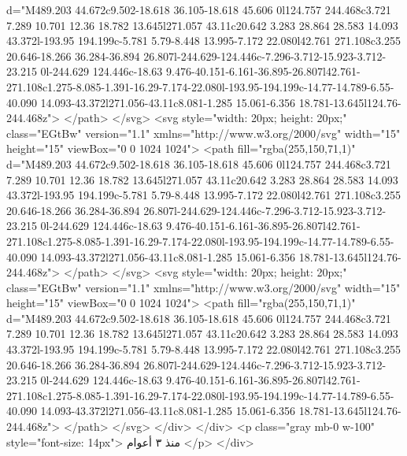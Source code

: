                         d="M489.203 44.672c9.502-18.618 36.105-18.618 45.606 0l124.757 244.468c3.721 7.289 10.701 12.36 18.782 13.645l271.057 43.11c20.642 3.283 28.864 28.583 14.093 43.372l-193.95 194.199c-5.781 5.79-8.448 13.995-7.172 22.080l42.761 271.108c3.255 20.646-18.266 36.284-36.894 26.807l-244.629-124.446c-7.296-3.712-15.923-3.712-23.215 0l-244.629 124.446c-18.63 9.476-40.151-6.161-36.895-26.807l42.761-271.108c1.275-8.085-1.391-16.29-7.174-22.080l-193.95-194.199c-14.77-14.789-6.55-40.090 14.093-43.372l271.056-43.11c8.081-1.285 15.061-6.356 18.781-13.645l124.76-244.468z">
                      </path>
                    </svg>
                    <svg style="width: 20px; height: 20px;" class="EGtBw" version="1.1"
                      xmlns="http://www.w3.org/2000/svg" width="15" height="15" viewBox="0 0 1024 1024">
                      <path fill="rgba(255,150,71,1)"
                        d="M489.203 44.672c9.502-18.618 36.105-18.618 45.606 0l124.757 244.468c3.721 7.289 10.701 12.36 18.782 13.645l271.057 43.11c20.642 3.283 28.864 28.583 14.093 43.372l-193.95 194.199c-5.781 5.79-8.448 13.995-7.172 22.080l42.761 271.108c3.255 20.646-18.266 36.284-36.894 26.807l-244.629-124.446c-7.296-3.712-15.923-3.712-23.215 0l-244.629 124.446c-18.63 9.476-40.151-6.161-36.895-26.807l42.761-271.108c1.275-8.085-1.391-16.29-7.174-22.080l-193.95-194.199c-14.77-14.789-6.55-40.090 14.093-43.372l271.056-43.11c8.081-1.285 15.061-6.356 18.781-13.645l124.76-244.468z">
                      </path>
                    </svg>
                    <svg style="width: 20px; height: 20px;" class="EGtBw" version="1.1"
                      xmlns="http://www.w3.org/2000/svg" width="15" height="15" viewBox="0 0 1024 1024">
                      <path fill="rgba(255,150,71,1)"
                        d="M489.203 44.672c9.502-18.618 36.105-18.618 45.606 0l124.757 244.468c3.721 7.289 10.701 12.36 18.782 13.645l271.057 43.11c20.642 3.283 28.864 28.583 14.093 43.372l-193.95 194.199c-5.781 5.79-8.448 13.995-7.172 22.080l42.761 271.108c3.255 20.646-18.266 36.284-36.894 26.807l-244.629-124.446c-7.296-3.712-15.923-3.712-23.215 0l-244.629 124.446c-18.63 9.476-40.151-6.161-36.895-26.807l42.761-271.108c1.275-8.085-1.391-16.29-7.174-22.080l-193.95-194.199c-14.77-14.789-6.55-40.090 14.093-43.372l271.056-43.11c8.081-1.285 15.061-6.356 18.781-13.645l124.76-244.468z">
                      </path>
                    </svg>
                  </div>
                </div>
                <p class="gray mb-0 w-100" style="font-size: 14px">
                  منذ ٣ أعوام
                </p>
              </div>

